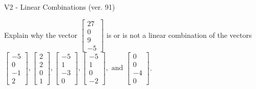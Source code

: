 \begin{exercise}
  \begin{exerciseTitle}V2 - Linear Combinations (ver. 91)\end{exerciseTitle}
  \begin{exerciseStatement}
    Explain why the vector \(\left[\begin{array}{c}
27 \\
0 \\
9 \\
-5
\end{array}\right]\)  is or is not a linear 
	combination of the vectors \(\left[\begin{array}{c}
-5 \\
0 \\
-1 \\
2
\end{array}\right] , \left[\begin{array}{c}
2 \\
2 \\
0 \\
1
\end{array}\right] , \left[\begin{array}{c}
-5 \\
1 \\
-3 \\
0
\end{array}\right] , \left[\begin{array}{c}
-5 \\
1 \\
0 \\
-2
\end{array}\right] , \text{ and } \left[\begin{array}{c}
0 \\
0 \\
-4 \\
0
\end{array}\right]\).
	



\end{exerciseStatement}
\end{exercise}
